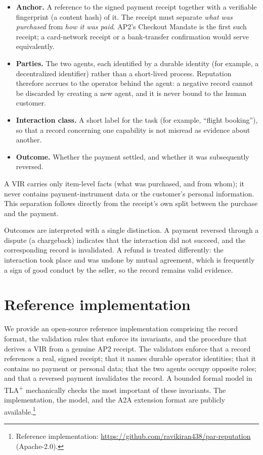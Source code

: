 \documentclass[11pt]{article}
\begin{document}
\begin{itemize}[leftmargin=*]
\item \textbf{Anchor.} A reference to the signed payment receipt together with a
verifiable fingerprint (a content hash) of it. The receipt must separate \emph{what was
purchased} from \emph{how it was paid}. AP2's Checkout Mandate is the first such
receipt; a card-network receipt or a bank-transfer confirmation would serve
equivalently.
\item \textbf{Parties.} The two agents, each identified by a durable identity (for
example, a decentralized identifier) rather than a short-lived process. Reputation
therefore accrues to the operator behind the agent: a negative record cannot be
discarded by creating a new agent, and it is never bound to the human customer.
\item \textbf{Interaction class.} A short label for the task (for example, ``flight
booking''), so that a record concerning one capability is not misread as evidence about
another.
\item \textbf{Outcome.} Whether the payment settled, and whether it was subsequently
reversed.
\end{itemize}

A VIR carries only item-level facts (what was purchased, and from whom); it never
contains payment-instrument data or the customer's personal information. This separation
follows directly from the receipt's own split between the purchase and the payment.

Outcomes are interpreted with a single distinction. A payment reversed through a dispute
(a chargeback) indicates that the interaction did not succeed, and the corresponding
record is invalidated. A refund is treated differently: the interaction took place and
was undone by mutual agreement, which is frequently a sign of good conduct by the
seller, so the record remains valid evidence.

\section{Reference implementation}
We provide an open-source reference implementation comprising the record format, the
validation rules that enforce its invariants, and the procedure that derives a VIR from
a genuine AP2 receipt. The validators enforce that a record references a real, signed
receipt; that it names durable operator identities; that it contains no payment or
personal data; that the two agents occupy opposite roles; and that a reversed payment
invalidates the record. A bounded formal model in TLA\textsuperscript{+} mechanically
checks the most important of these invariants. The implementation, the model, and the
A2A extension format are publicly available.\footnote{Reference implementation:
\url{https://github.com/ravikiran438/par-reputation} (Apache-2.0).}
\end{document}
